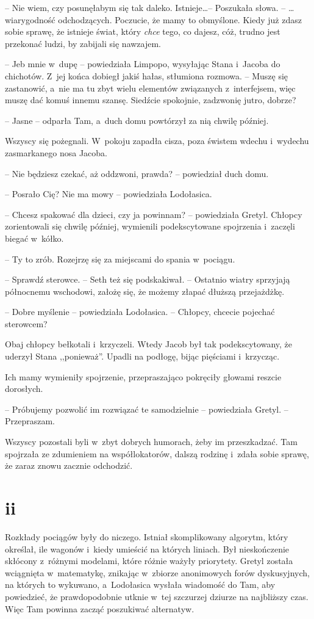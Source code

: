 \documentclass[oneside,polish,11pt,sfheadings]{mwbk}
\begin{document}
-- Nie wiem, czy posunęłabym się tak daleko.
Istnieje\ldots  -- Poszukała słowa. -- \ldots  wiarygodność odchodzących.
Poczucie, że mamy to obmyślone. Kiedy już zdasz sobie sprawę, że
istnieje świat, który \textit{chce }tego, co dajesz, cóż, trudno jest
przekonać ludzi, by zabijali się nawzajem.

-- Jeb mnie w~dupę -- powiedziała Limpopo, wysyłając Stana i~Jacoba do
chichotów. Z~jej końca dobiegł jakiś hałas, stłumiona rozmowa. -- Muszę
się zastanowić, a~nie ma tu zbyt wielu elementów związanych z~interfejsem, więc muszę dać komuś innemu szansę. Siedźcie spokojnie,
zadzwonię jutro, dobrze?

-- Jasne -- odparła Tam, a~duch domu powtórzył za nią chwilę później.

Wszyscy się pożegnali. W~pokoju zapadła cisza, poza świstem wdechu i~wydechu zasmarkanego nosa Jacoba.

-- Nie będziesz czekać, aż oddzwoni, prawda? -- powiedział duch domu.

-- Posrało Cię? Nie ma mowy -- powiedziała Lodołasica.

-- Chcesz spakować dla dzieci, czy ja powinnam? -- powiedziała Gretyl.
Chłopcy zorientowali się chwilę później, wymienili podekscytowane
spojrzenia i~zaczęli biegać w~kółko.

-- Ty to zrób. Rozejrzę się za miejscami do spania w~pociągu.

-- Sprawdź sterowce. -- Seth też się podskakiwał. -- Ostatnio wiatry
sprzyjają północnemu wschodowi, założę się, że możemy złapać dłuższą
przejażdżkę.

-- Dobre myślenie -- powiedziała Lodołasica. -- Chłopcy, chcecie pojechać
sterowcem?

Obaj chłopcy bełkotali i~krzyczeli. Wtedy Jacob był tak podekscytowany,
że uderzył Stana ,,ponieważ''. Upadli na podłogę, bijąc pięściami i~krzycząc.

Ich mamy wymieniły spojrzenie, przepraszająco pokręciły głowami reszcie
dorosłych. 

-- Próbujemy pozwolić im rozwiązać te samodzielnie -- powiedziała Gretyl. -- Przepraszam.

Wszyscy pozostali byli w~zbyt dobrych humorach, żeby im przeszkadzać.
Tam spojrzała ze zdumieniem na współlokatorów, dalszą rodzinę i~zdała
sobie sprawę, że zaraz znowu zacznie odchodzić.

\chapter*{ii}
Rozkłady pociągów były do niczego. Istniał skomplikowany algorytm, który
określał, ile wagonów i~kiedy umieścić na których liniach. Był
nieskończenie skłócony z~różnymi modelami, które różnie ważyły
priorytety. Gretyl została wciągnięta w~matematykę, znikając w~zbiorze
anonimowych forów dyskusyjnych, na których to wykuwano, a~Lodołasica
wysłała wiadomość do Tam, aby powiedzieć, że prawdopodobnie utknie w~tej
szczurzej dziurze na najbliższy czas. Więc Tam powinna zacząć poszukiwać
alternatyw.
\end{document}
